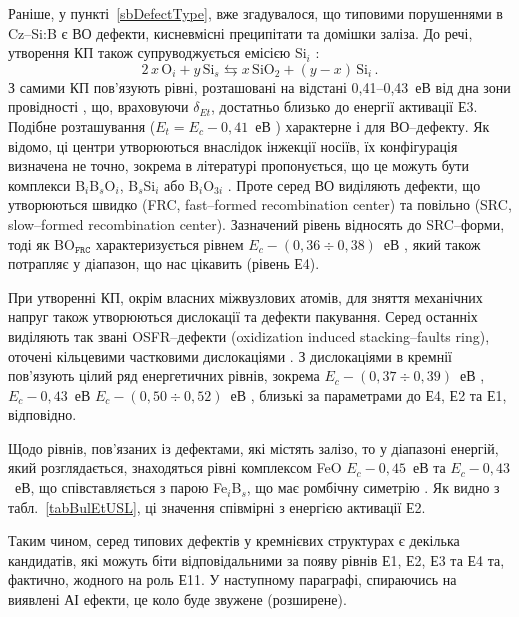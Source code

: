 Раніше, у пункті~\ref{sbDefectType}, вже згадувалося, що
типовими порушеннями в Cz--Si:B є ВО дефекти, кисневмісні преципітати та домішки заліза.
До речі, утворення КП також супруводжується емісією Si$_i$ \cite{MSER13}:
\begin{equation*}\label{eqSiO}
  2\,x\,\mbox{O}_i+y\,\mbox{Si}_s\leftrightarrows x\,\mbox{SiO}_2+(y-x)\,\mbox{Si}_i\,.
\end{equation*}
З самими КП пов'язують рівні, розташовані на відстані 0,41--0,43~еВ від дна зони провідності \cite{SiO:Mchedlidze,SiO:Vanhell,SiO:Chan}, що, враховуючи  $\delta_{Et}$, достатньо близько до енергії активації Е3.
Подібне розташування ($E_t=E_c-0,41$~еВ \cite{LIDRev,LIDRev2,BO3i,Rein,LID:SchmidtJMR}) характерне і для ВО--дефекту.
Як відомо, ці центри утворюються внаслідок інжекції носіїв,
їх конфігурація визначена не точно, зокрема в літературі пропонується,
що це можуть бути комплекси B$_i$B$_s$O$_i$, B$_s$Si$_i$\cite{LIDRev} або
B$_i$O$_{3i}$ \cite{BO3i}.
Проте серед ВО виділяють дефекти,
що утворюються швидко (FRC, fast--formed recombination center)
та повільно (SRC, slow--formed recombination center).
Зазначений рівень відносять до SRC--форми,
тоді як  BO$_\mathtt{FRC}$ характеризується рівнем $E_c-(0,36\div0,38)$~еВ \cite{LIDRev2,BOSingle:SEMSS2017}, який
також потрапляє у діапазон, що нас цікавить (рівень Е4).

При утворенні КП, окрім власних міжвузлових атомів, для зняття механічних напруг також утворюються дислокації та дефекти пакування.
Серед останніх виділяють так звані OSFR--дефекти (oxidization induced stacking--faults ring), оточені кільцевими частковими дислокаціями \cite{MSER74,MSER28}.
З дислокаціями в кремнії пов'язують цілий ряд енергетичних рівнів, зокрема
$E_c-(0,37\div0,39)$~еВ \cite{PhysRevB56:10208,kveder2008,SiO:Hwang,disl10:Isakova,Kittler2003},
$E_c-0,43$~еВ \cite{PhysRevB56:10208,SiO:Vanhell}
$E_c-(0,50\div0,52)$~еВ \cite{Edis:Ogawa,Edis:Omling,Kittler2003},
близькі за параметрами до Е4, Е2 та Е1, відповідно.

Щодо рівнів, пов'язаних із дефектами, які містять залізо, то у діапазоні енергій, який розглядається,
знаходяться рівні комплексом FeO $E_c-0,45$~еВ\cite{FeO}
та $E_c-0,43$~еВ, що співставляється з парою Fe$_i$B$_s$, що має ромбічну симетрію \cite{FeB:PhysRevB49,Istratov1999}.
Як видно з табл.~\ref{tabBulEtUSL}, ці значення співмірні з енергією активації Е2.

Таким чином, серед типових дефектів у кремнієвих структурах є декілька кандидатів,
які можуть біти відповідальними за появу рівнів Е1, Е2, Е3 та Е4 та, фактично, жодного на роль Е11.
У наступному параграфі, спираючись на виявлені АІ ефекти, це коло буде звужене (розширене).

